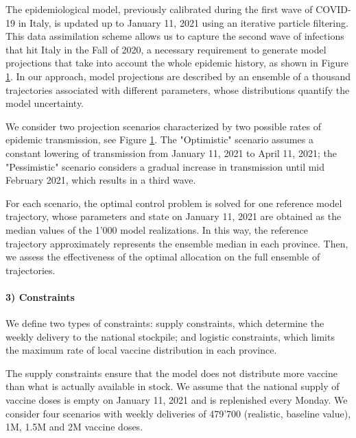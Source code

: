 \begin{figure}[!ht]
{    }\label{fig:model_DA}
\end{figure}

The epidemiological model, previously calibrated during the first wave of COVID-19 in Italy\cite{Gatto:SpreadDynamicsCOVID19:2020,Bertuzzo:GeographyCOVID19Spread:2020}, is updated up to January 11, 2021 using an iterative particle filtering. This data assimilation scheme allows us to capture the second wave of infections that hit Italy in the Fall of 2020, a necessary requirement to generate model projections that take into account the whole epidemic history, as shown in Figure \ref{fig:model_DA}. In our approach, model projections are described by an ensemble of a thousand trajectories associated with different parameters, whose distributions quantify the model uncertainty. 

We consider two projection scenarios characterized by two possible rates of epidemic transmission, see Figure \ref{fig:model_DA}. The "Optimistic" scenario assumes a constant lowering of transmission from January 11, 2021 to April 11, 2021; the "Pessimistic" scenario considers a gradual increase in transmission until mid February 2021, which results in a third wave. 

For each scenario, the optimal control problem is solved for one reference model trajectory, whose parameters and state on January 11, 2021 are obtained as the median values of the 1'000 model realizations. In this way, the reference trajectory approximately represents the ensemble median in each province. Then, we assess the effectiveness of the optimal allocation on the full ensemble of trajectories.


\paragraph{3) Constraints} We define two types of constraints: supply constraints, which determine the weekly delivery to the national stockpile; and logistic constraints, which limits the maximum rate of local vaccine distribution in each province.

The supply constraints ensure that the model does not distribute more vaccine than what is actually available in stock. We assume that the national supply of vaccine doses is empty on January 11, 2021 and is replenished every Monday. We consider four scenarios with weekly deliveries of 479'700 (realistic, baseline value), 1M, 1.5M and 2M vaccine doses.

